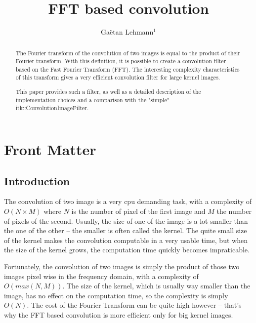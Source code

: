 \documentclass{InsightArticle}
\title{FFT based convolution}
\author{Ga\"etan Lehmann{$^1$}}
\newcommand{\IJhandlerIDnumber}{}
\begin{document}
%
% 
\IJhandlefooter{\IJhandlerIDnumber}

\maketitle

\ifhtml
\chapter*{Front Matter\label{front}}
\fi


\begin{abstract}
\noindent

The Fourier transform of the convolution of two images is equal to the product of their
Fourier transform. With this definition, it is possible to create a convolution filter
based on the Fast Fourier Transform (FFT). The interesting complexity characteristics of
this transform gives a very efficient convolution filter for large kernel images.

This paper provides such a filter, as well as a detailed description of the implementation
choices and a comparison with the "simple" itk::ConvolutionImageFilter.

\end{abstract}

\IJhandlenote{\IJhandlerIDnumber}

\tableofcontents

\section{Introduction}

The convolution of two image is a very cpu demanding task, with a complexity of $O(N \times M)$ where $N$ is
the number of pixel of the first image and $M$ the number of pixels of the second. Usually, the size
of one of the image is a lot smaller than the one of the other -- the smaller is often called the
kernel. The quite small size of the kernel makes the convolution computable in a very usable time,
but when the size of the kernel grows, the computation time quickly becomes impraticable.

Fortunately, the convolution of two images is simply the product of those two images pixel wise in
the frequency domain, with a complexity of $O(max(N, M))$. The size of the kernel, which is usually
way smaller than the image, has no effect on the computation time, so the complexity is simply $O(N)$.
The cost of the Fourier Transform
can be quite high however -- that's why the FFT based convolution is more efficient only for big
kernel images.
\end{document}

